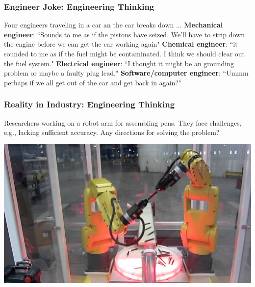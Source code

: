 \documentclass[11pt]{beamer}
\begin{document}
\begin{frame}
	\frametitle{Engineer Joke: Engineering Thinking}
	\Enlarge
	\begin{itemize} 
		\myitem Four engineers traveling in a car an the car breaks down ...
		\myitem \textbf{Mechanical engineer}: ``Sounds to me as if the pistons have seized. We'll have to strip down the engine before we can get the car working again"
		\myitem \textbf{Chemical engineer}: ``it sounded to me as if the fuel might be contaminated. I think we should clear out the fuel system."
		\myitem \textbf{Electrical engineer}: ``I thought it might be an grounding problem or maybe a faulty plug lead."
		\myitem \textbf{Software/computer engineer}: ``Ummm perhaps if we all get out of the car and get back in again?"
	\end{itemize}
\end{frame}



\begin{frame}
	\frametitle{Reality in Industry: Engineering  Thinking}
	\Enlarge
	\begin{itemize} 
		\myitem Researchers working on a robot arm for assembling pens.
		\myitem They face challenges, e.g., lacking sufficient accuracy.
		\myitem Any directions for solving the problem?
	
	\end{itemize}
	 \includegraphics[width=\textwidth]{./img/robotarm.jpg}
\end{frame}

\end{document}
